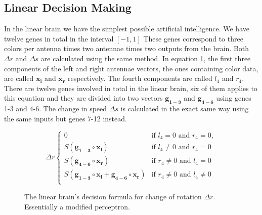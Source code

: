 \documentclass[a4paper,11pt]{kth-mag}
\begin{document}
\subsection{Linear Decision Making}
In the linear brain we have the simplest possible artificial intelligence. We have twelve genes in total in the interval $[-1,1]$ These genes correspond to three colors per antenna times two antennae times two outputs from the brain. Both $\Delta r$ and $\Delta s$ are calculated using the same method. In equation \ref{linear-decide}, the first three components of the left and right antennae vectors, the ones containing color data, are called $\mathbf{x_{l}}$ and $\mathbf{x_{r}}$ respectively. The fourth components are called $l_4$ and $r_4$. There are twelve genes involved in total in the linear brain, six of them applies to this equation and they are divided into two vectors $\mathbf{g_{1-3}}$ and $\mathbf{g_{4-6}}$ using genes 1-3 and 4-6. The change in speed $\Delta s$ is calculated in the exact same way using the same inputs but genes 7-12 instead.


\begin{figure}
\begin{equation}
\Delta r
\begin{cases}
	0 & \text{if $l_4 = 0$ and $r_4 = 0$},\\
	S(\mathbf{g_{1-3}} \circ \mathbf{x_l}) & \text{if $l_4 \neq 0$ and $r_4 = 0$}\\
	S(\mathbf{g_{4-6}} \circ \mathbf{x_r}) & \text{if $r_4 \neq 0$ and $l_4 = 0$}\\
	S(\mathbf{g_{1-3}} \circ \mathbf{x_l} + \mathbf{g_{4-6}} \circ \mathbf{x_r} ) & \text{if $r_4 \neq 0$ and $l_4 \neq 0$}\\
\end{cases}	
\end{equation}
\caption{The linear brain's decision formula for change of rotation $\Delta r$. Essentially a modified perceptron.}
\label{linear-decide}
\end{figure}
\end{document}
